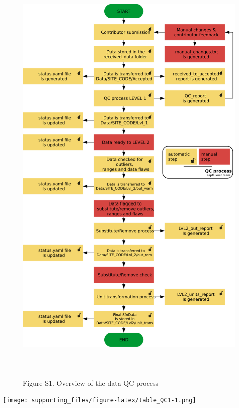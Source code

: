 \documentclass[]{article}
\begin{document}
\begin{figure}

{\centering \includegraphics[height=800px]{resources/QC_summary2} 

}

\caption{Figure S1. Overview of the data QC process}\label{fig:fig_QC}
\end{figure}

\pagebreak

\texttt{[image: supporting\_files/figure-latex/table\_QC1-1.png]}
\pagebreak
\end{document}
